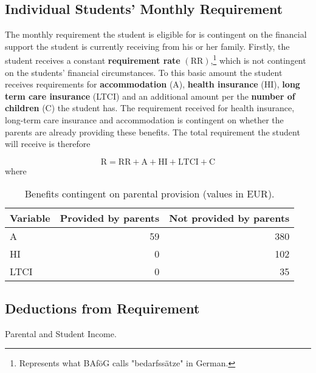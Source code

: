 









\subsection{Individual Students' Monthly Requirement}
The monthly requirement the student is eligible for is contingent on the financial support 
the student is currently receiving from his or her family. 
Firstly, the student receives a constant \textbf{requirement rate} \( (\text{RR})  \),\footnote{Represents what BAföG calls "bedarfssätze" in German.} which is not contingent on the students' financial 
circumstances. To this basic amount the student receives requirements for \textbf{accommodation} (A), 
\textbf{health insurance} (HI), \textbf{long term care insurance} (LTCI) and an additional amount per the 
\textbf{number of children} (C) the student has. 
The requirement received for health insurance, long-term care insurance and accommodation is contingent on 
whether the parents are already providing these benefits. 
The total requirement the student will receive is therefore 

\begin{equation} \label{eq:total-requirement}
  \text{R} = \text{RR}  + \text{A} + \text{HI} + \text{LTCI} + \text{C}
\end{equation}
where
\begin{table}[H]
\small
\centering
  \begin{tabular}{lrr}
  \hline
  Variable & Provided by parents & Not provided by parents \\
  \hline
  A & 59 & 380 \\
  HI & 0 & 102 \\
  LTCI & 0 & 35 \\
  \hline
  \end{tabular}
\caption{Benefits contingent on parental provision (values in EUR).}
\end{table}



\subsection{Deductions from Requirement}
Parental and Student Income.

